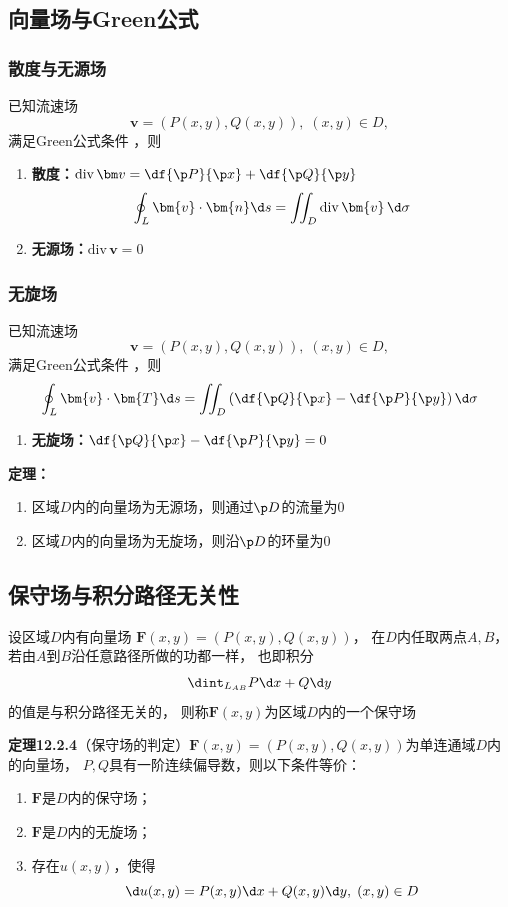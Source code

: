 \subsection{向量场与Green公式}

\subsubsection{散度与无源场}

已知流速场
$$\bm{v}=(P(x,y),Q(x,y)),\;(x,y)\in D,$$
满足Green公式条件 ，则
\begin{enumerate}
  \item {\bf 散度：}${\mathrm{div}\,\bm v=\df{\p P}{\p x}+\df{\p Q}{\p
  y}}$ 
  $$\oint_L\bm{v}\cdot\bm{n}\d
  s=\iint_D\mathrm{div}\,\bm{v}\,\d\sigma$$
  \item {\bf 无源场：}${\mathrm{div}\,\bm{v}=0}$
\end{enumerate}

\subsubsection{无旋场}

已知流速场
$$\bm{v}=(P(x,y),Q(x,y)),\;(x,y)\in D,$$
满足Green公式条件 ，则
$$\oint_L\bm{v}\cdot\bm{T}\d s=\iint_D\left(
\df{\p Q}{\p x}-\df{\p P}{\p y}\right)\d\sigma $$
\begin{enumerate}
  \addtocounter{enumi}{2}
  \item {\bf 无旋场：}${\df{\p Q}{\p x}-\df{\p P}{\p y}=0}$
\end{enumerate}

{\bf 定理：}
\begin{enumerate}[(1)]
  \setlength{\itemindent}{1cm}
  \item 区域$D$内的向量场为无源场，则通过$\p D$的流量为$0$
  \item 区域$D$内的向量场为无旋场，则沿$\p D$的环量为$0$
\end{enumerate}

\subsection{保守场与积分路径无关性}

设区域$D$内有向量场
$\bm{F}(x,y)=(P(x,y),Q(x,y))$，
在$D$内任取两点$A,B$，若由$A$到$B$沿任意路径所做的功都一样，
也即积分
$$\dint_{L_{AB}}P\d x+Q\d y$$
的值是与积分路径无关的，
则称$\bm{F}(x,y)$为区域$D$内的一个保守场

{\bf 定理12.2.4}（保守场的判定）$\bm{F}(x,y)=(P(x,y),Q(x,y))$为单连通域$D$内的向量场，
$P,Q$具有一阶连续偏导数，则以下条件等价：
\begin{enumerate}[(1)]
  \setlength{\itemindent}{1cm}
  \item $\bm{F}$是$D$内的保守场；
  \item $\bm{F}$是$D$内的无旋场；
  \item 存在$u(x,y)$，使得
  $$\d u(x,y)=P(x,y)\d x+Q(x,y)\d y,\;(x,y)\in D$$
\end{enumerate}

